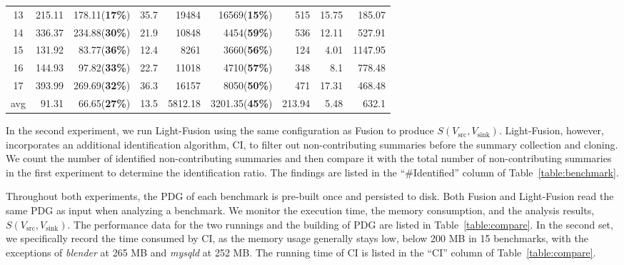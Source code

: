 \begin{table}[]
{\begin{tabular}{c|rrr|rrrr|r}
13  & 215.11    & 178.11(\textbf{17\%})    & 35.7    & 19484   & 16569(\textbf{15\%})   & 515    & 15.75                 & 185.07  \\
14  & 336.37     & 234.88(\textbf{30\%})     & 21.9    & 10848   & 4454(\textbf{59\%})    & 536    & 12.11                 & 527.91  \\ \hline
15  & 131.92     & 83.77(\textbf{36\%})     & 12.4    & 8261    & 3660(\textbf{56\%})    & 124    & 4.01                  & 1147.95 \\
16  & 144.93     & 97.82(\textbf{33\%})     & 22.7    & 11018   & 4710(\textbf{57\%})    & 348    & 8.1                   & 778.48  \\
17  & 393.99     & 269.69(\textbf{32\%})     & 36.3    & 16157   & 8050(\textbf{50\%})    & 471    & 17.31                 & 468.48  \\ \hline
avg & 91.31     & 66.65(\textbf{27\%})     & 13.5    & 5812.18 & 3201.35(\textbf{45\%}) & 213.94 & 5.48                  & 632.1   \\ \hline
\end{tabular}
}
\end{table}

In the second experiment, we run Light-Fusion using the same configuration as Fusion to produce $S(V_{\text{src}}, V_{\text{sink}})$. 
Light-Fusion, however, incorporates an additional identification algorithm, CI, to filter out non-contributing summaries before the summary collection and cloning.
We count the number of identified non-contributing summaries and then compare it with the total number of non-contributing summaries in the first experiment to determine the identification ratio.
The findings are listed in the ``\#Identified'' column of Table~\ref{table:benchmark}.


Throughout both experiments, 
the PDG of each benchmark is pre-built once and persisted to disk.
Both Fusion and Light-Fusion read the same PDG as input when analyzing a benchmark.
We monitor the execution time, the memory consumption, and the analysis results, $S(V_{\text{src}}, V_{\text{sink}})$. 
The performance data for the two runnings and the building of PDG are listed in Table~\ref{table:compare}. 
In the second set, we specifically record the time consumed by CI, as the memory usage generally stays low, below 200 MB in 15 benchmarks, with the exceptions of \textit{blender} at 265 MB and \textit{mysqld} at 252 MB.
The running time of CI is listed in the ``CI'' column of Table~\ref{table:compare}.

